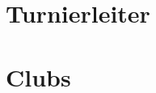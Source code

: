 \documentclass[12pt,a4paper,titlepage,xcolor=dvipsnames,bibliography=totoc, listof=totoc]{scrartcl}
\begin{document}
\label{Begin Document}		%
\label{Titlepage}	%
\cleardoublepage{}\tableofcontents
\newpage \label{Table of Contents}		%



\label{Sec: Forms}			 %



\section{Turnierleiter}

\newpage

\newpage

\newpage

\newpage

\newpage

\section{Clubs}

\newpage





\end{document}
